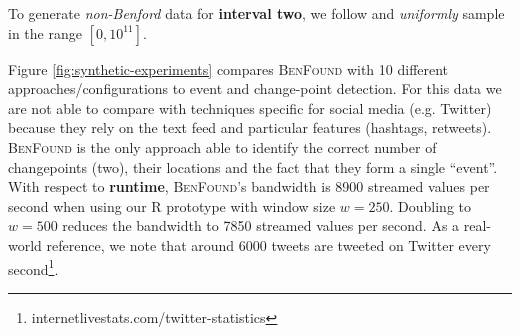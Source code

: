 \documentclass[twoside,leqno,twocolumn]{article}\usepackage[]{graphicx}\usepackage[]{color}
\newcommand{\algoname}{\textsc{BenFound}}
\begin{document}
To generate \textit{non-Benford} data for \textbf{interval two}, we follow \cite{berger2011benford} and \textit{uniformly} sample in the range $[0,10^{11}]$.

Figure \ref{fig:synthetic-experiments} compares \algoname{} with 10 different approaches/configurations to event and change-point detection. For this data we are not able to compare with techniques specific for social media (e.g. Twitter) because they rely on the text feed and particular features (hashtags, retweets). \algoname{} is the only approach able to identify the correct number of changepoints (two), their locations and the fact that they form a single ``event''. With respect to \textbf{runtime}, \algoname{}'s bandwidth is 8900 streamed values per second when using our R prototype with window size $w=250$. Doubling to $w=500$ reduces the bandwidth to 7850 streamed values per second. As a real-world reference, we note that around 6000 tweets are tweeted on Twitter every second\footnote{internetlivestats.com/twitter-statistics}.


\end{document}

